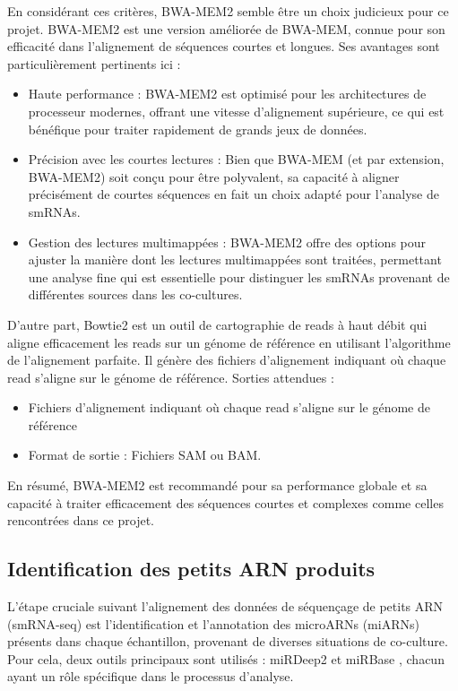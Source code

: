 \documentclass{report}
\begin{document}
En considérant ces critères, BWA-MEM2\cite{bwamem2} semble être un choix judicieux pour ce projet. BWA-MEM2 est une version améliorée de BWA-MEM, connue pour son efficacité dans l'alignement de séquences courtes et longues. Ses avantages sont particulièrement pertinents ici :

\begin{itemize}
    \item Haute performance : BWA-MEM2 est optimisé pour les architectures de processeur modernes, offrant une vitesse d'alignement supérieure, ce qui est bénéfique pour traiter rapidement de grands jeux de données.
    \item Précision avec les courtes lectures : Bien que BWA-MEM (et par extension, BWA-MEM2) soit conçu pour être polyvalent, sa capacité à aligner précisément de courtes séquences en fait un choix adapté pour l'analyse de smRNAs.
    \item Gestion des lectures multimappées : BWA-MEM2 offre des options pour ajuster la manière dont les lectures multimappées sont traitées, permettant une analyse fine qui est essentielle pour distinguer les smRNAs provenant de différentes sources dans les co-cultures.
\end{itemize} \vspace{.5cm}

D'autre part,   Bowtie2 \cite{bowtie2} est un outil de cartographie de reads à haut débit qui aligne efficacement les reads sur un génome de référence en utilisant l'algorithme de l'alignement parfaite. Il génère des fichiers d'alignement indiquant où chaque read s'aligne sur le génome de référence.
Sorties attendues :
\begin{itemize}
    \item Fichiers d'alignement indiquant où chaque read s'aligne sur le génome de référence
    \item Format de sortie : Fichiers SAM ou BAM.
\end{itemize} \vspace{.5cm}

En résumé, BWA-MEM2 est recommandé pour sa performance globale et sa capacité à traiter efficacement des séquences courtes et complexes comme celles rencontrées dans ce projet. 

\subsection{Identification des petits ARN produits }
L'étape cruciale suivant l'alignement des données de séquençage de petits ARN (smRNA-seq) est l'identification et l'annotation des microARNs (miARNs) présents dans chaque échantillon, provenant de diverses situations de co-culture. Pour cela, deux outils principaux sont utilisés : miRDeep2\cite{friedlander2012discover} et miRBase \cite{kozomara2019mirbase}, chacun ayant un rôle spécifique dans le processus d'analyse.\\ 
\end{document}

